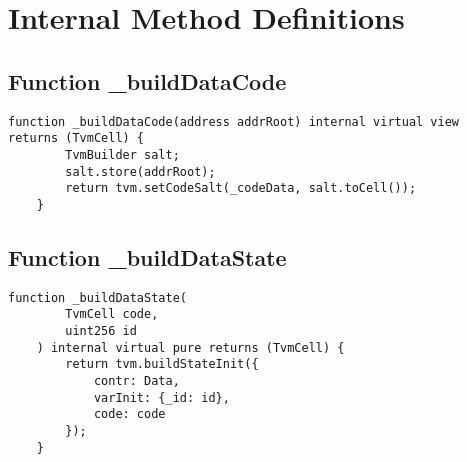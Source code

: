 \section{Internal Method Definitions}


\subsection{Function \_{}buildDataCode}

\begin{lstlisting}[firstnumber=27]
    function _buildDataCode(address addrRoot) internal virtual view returns (TvmCell) {
        TvmBuilder salt;
        salt.store(addrRoot);
        return tvm.setCodeSalt(_codeData, salt.toCell());
    }
\end{lstlisting}

\subsection{Function \_{}buildDataState}

\begin{lstlisting}[firstnumber=33]
    function _buildDataState(
        TvmCell code,
        uint256 id
    ) internal virtual pure returns (TvmCell) {
        return tvm.buildStateInit({
            contr: Data,
            varInit: {_id: id},
            code: code
        });
    }
\end{lstlisting}

